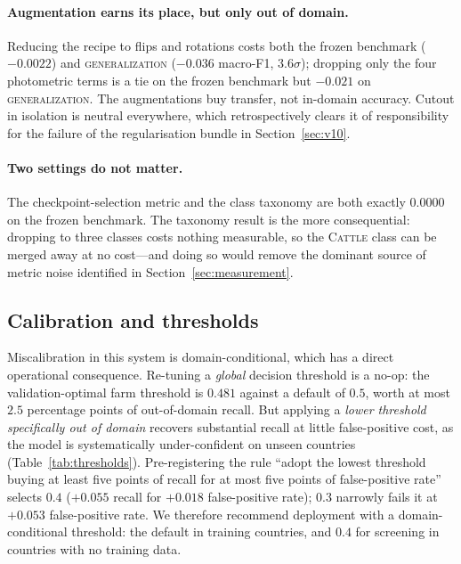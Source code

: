 \documentclass[11pt,a4paper]{article}
\begin{document}
\paragraph{Augmentation earns its place, but only out of domain.} Reducing the
recipe to flips and rotations costs both the frozen benchmark ($-0.0022$) and
\textsc{generalization} ($-0.036$ macro-F1, $3.6\sigma$); dropping only the four
photometric terms is a tie on the frozen benchmark but $-0.021$ on
\textsc{generalization}. The augmentations buy transfer, not in-domain accuracy.
Cutout in isolation is neutral everywhere, which retrospectively clears it of
responsibility for the failure of the regularisation bundle in
Section~\ref{sec:v10}.

\paragraph{Two settings do not matter.} The checkpoint-selection metric and the
class taxonomy are both exactly $0.0000$ on the frozen benchmark. The taxonomy
result is the more consequential: dropping to three classes costs nothing
measurable, so the \textsc{Cattle} class can be merged away at no cost---and
doing so would remove the dominant source of metric noise identified in
Section~\ref{sec:measurement}.

\subsection{Calibration and thresholds}
\label{sec:thresholds}

Miscalibration in this system is domain-conditional, which has a direct
operational consequence. Re-tuning a \emph{global} decision threshold is a
no-op: the validation-optimal farm threshold is $0.481$ against a default of
$0.5$, worth at most $2.5$ percentage points of out-of-domain recall. But
applying a \emph{lower threshold specifically out of domain} recovers
substantial recall at little false-positive cost, as the model is
systematically under-confident on unseen countries
(Table~\ref{tab:thresholds}). Pre-registering the rule ``adopt the lowest
threshold buying at least five points of recall for at most five points of
false-positive rate'' selects $0.4$ ($+0.055$ recall for $+0.018$ false-positive
rate); $0.3$ narrowly fails it at $+0.053$ false-positive rate. We therefore
recommend deployment with a domain-conditional threshold: the default in training
countries, and $0.4$ for screening in countries with no training data.
\end{document}
